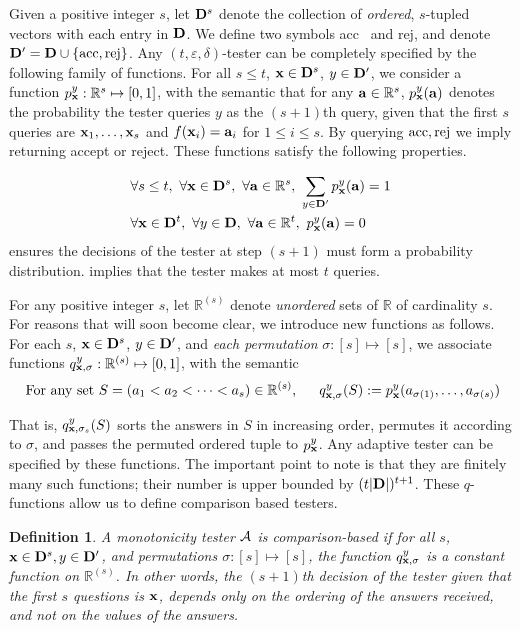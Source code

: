 \documentclass[11pt]{article}
\newtheorem{definition}[theorem]{Definition}
\def\eps{\varepsilon}
\def\R{{\mathbb R}}
\def\x{{\bf x}}
\newcommand{\cA}{{\cal A}}
\newcommand{\acc}{\hbox{acc}}
\newcommand{\rej}{\hbox{rej}}
\begin{document}
Given a positive integer $s$, let ${\mathbf D}^s$ denote the collection of {\em ordered}, $s$-tupled vectors with each entry in ${\mathbf D}$.
We define two symbols \acc~ and \rej, and denote $\D' = \D \cup \{\acc, \rej\}$.
Any $(t,\eps,\delta)$-tester can be completely specified by the following family of functions.
For all $s\leq t$, $\x\in \D^s$, $y\in {\mathbf D}'$, we consider a function $p^y_\x:\R^s \mapsto [0,1]$, with the semantic that for any $\a\in \R^s$, $p^y_\x(\a)$ denotes the probability the tester queries $y$ as the $(s+1)$th query, given that the 
first $s$ queries are $\x_1,\ldots,\x_s$ and $f(\x_i) = \a_i$ for $1\leq i\leq s$. By querying $\acc,\rej$ we imply returning accept or reject. These functions satisfy the following properties.

\begin{align}
& \forall s \leq t,~ \forall\x\in \D^s,~ \forall \a \in \R^s,~ \sum_{y \in \D'} p^y_\x(\a) = 1 \label{eqn:dist}\\
& \forall \x\in \D^t,~ \forall y \in \D,~ \forall \a \in \R^t,~ p^y_\x(\a) = 0 \label{eqn:time}
\end{align}
 ensures the decisions of the tester at step $(s+1)$ must form a probability distribution.  implies that the tester makes at most $t$ queries.


For any positive integer $s$, let $\R^{(s)}$ denote {\em unordered} sets of $\R$ of cardinality $s$. For reasons that will soon become clear, we introduce new functions as follows. For each $s$,  $\x\in \D^s$, $y\in {\mathbf D}'$, and {\em each permutation} $\sigma:[s]\mapsto [s]$, we associate functions $q^y_{\x,\sigma}:\R^{(s)} \mapsto [0,1]$, with the semantic
$$\textrm{ For any set $S = (a_1 < a_2 < \cdots < a_s) \in \R^{(s)}$, } ~~~~q^y_{\x,\sigma}(S) := p^y_\x(a_{\sigma(1)},\ldots,a_{\sigma(s)})$$

That is, $q^y_{\x,\sigma_s}(S)$ sorts the answers in $S$ in increasing order, permutes it according to $\sigma$, and passes the permuted ordered tuple to $p^y_\x$. Any adaptive tester can be specified by these functions. The important point to note is that they are finitely many such functions; their number is upper bounded by $(t|{\mathbf D}|)^{t+1}$. These $q$-functions allow us to define comparison based testers.


\begin{definition} \label{def:comp}
A monotonicity tester $\cA$ is \emph{comparison-based} if for all $s$,$\x\in \D^s,y\in\D'$, and permutations $\sigma:[s]\mapsto[s]$, the function $q^y_{\x,\sigma}$ is a constant function on $\R^{(s)}$. 
In other words, the $(s+1)$th decision of the tester given that the first $s$ questions is $\x$, depends only on the {\em ordering} of the answers received, and not on the values of the answers.
\end{definition}
\end{document}
